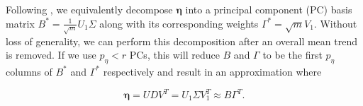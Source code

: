 \documentclass[11pt]{article}
\begin{document}
Following \cite{higdon2008computer, higdon2010estcosmo}, we equivalently decompose 
$\boldsymbol\eta$ into a principal component (PC) basis matrix 
$B^* = \frac{1}{\sqrt{m}}U_1\Sigma$ along with its corresponding weights 
$\Gamma^* = \sqrt{m}V_1$. Without loss of generality, we can perform this decomposition 
after an overall mean trend is removed. If we use $p_\eta < r$ PCs, this will reduce 
$B$ and $\Gamma$ to be the first $p_\eta$ columns of $B^*$ and $\Gamma^*$ respectively and 
result in an approximation where 

\begin{equation}
    \boldsymbol\eta= UDV^T = U_1\Sigma V_1^T \approx B\Gamma^T.
\end{equation}



\end{document}

